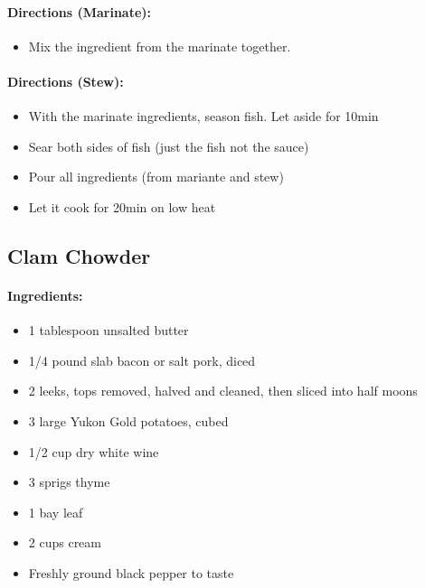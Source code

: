 \documentclass{article}
\begin{document}
\paragraph{Directions (Marinate):}
\begin{itemize}
	\item Mix the ingredient from the marinate together.
\end{itemize}


\paragraph{Directions (Stew):}
\begin{itemize}
	\item With the marinate ingredients, season fish. Let aside for 10min
	\item Sear both sides of fish (just the fish not the sauce)
	\item Pour all ingredients (from mariante and stew)
	\item Let it cook for 20min on low heat
\end{itemize}


\subsection{Clam Chowder}{}

\paragraph{Ingredients:}

\begin{itemize}
	\item 1 tablespoon unsalted butter
	\item 1/4 pound slab bacon or salt pork, diced
	\item 2 leeks, tops removed, halved and cleaned, then sliced into half moons
	\item 3 large Yukon Gold potatoes, cubed
	\item 1/2 cup dry white wine
	\item 3 sprigs thyme
	\item 1 bay leaf
	\item 2 cups cream
	\item Freshly ground black pepper to taste
\end{itemize}
\end{document}
